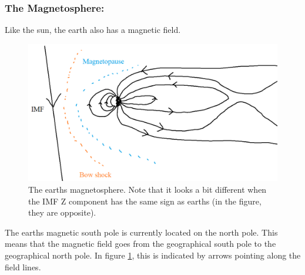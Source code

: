 \documentclass[norsk,a4paper,11pt]{article}
\begin{document}
\begin{multicols}{2}
	\subsubsection{The Magnetosphere:}
		Like the sun, the earth also has a magnetic field.
		\begin{figure}[H]
			\includegraphics[scale = 0.4]{Figures/magnetosphere.png}
			\centering
			\caption{The earths magnetosphere. Note that it looks a bit different when the IMF Z component has the same sign as earths (in the figure, they are opposite).}
			\label{fig::magnetopause}
		\end{figure}
	
	The earths magnetic south pole is currently located on the north pole. This means that the magnetic field goes from the geographical south pole to the 			geographical north pole. In figure \ref{fig::magnetopause}, this is indicated by arrows pointing along the field lines.


\end{multicols}
\end{document}
